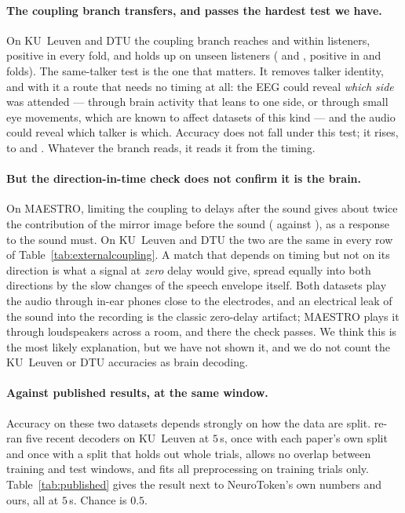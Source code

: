 \paragraph{The coupling branch transfers, and passes the hardest test we have.}
On KU~Leuven and DTU the coupling branch reaches
 and 
within listeners, positive in every fold, and holds up on unseen listeners
( and ,
positive in  and
 folds). The same-talker test is the one that
matters. It removes talker identity, and with it a route that needs no timing at
all: the EEG could reveal \emph{which side} was attended --- through brain
activity that leans to one side, or through small eye movements, which are known
to affect datasets of this kind \citep{rotaru2024} --- and the audio could reveal
which talker is which. Accuracy does not fall under this test; it rises, to
 and .
Whatever the branch reads, it reads it from the timing.

\paragraph{But the direction-in-time check does not confirm it is the brain.}
On MAESTRO, limiting the coupling to delays after the sound gives about twice the
contribution of the mirror image before the sound
( against ), as a
response to the sound must. On KU~Leuven and DTU the two are the same in every row
of Table~\ref{tab:externalcoupling}. A match that depends on timing but not on its
direction is what a signal at \emph{zero} delay would give, spread equally into
both directions by the slow changes of the speech envelope itself. Both datasets
play the audio through in-ear phones close to the electrodes, and an electrical
leak of the sound into the recording is the classic zero-delay artifact; MAESTRO
plays it through loudspeakers across a room, and there the check passes. We think
this is the most likely explanation, but we have not shown it, and we do not count
the KU~Leuven or DTU accuracies as brain decoding.

\paragraph{Against published results, at the same window.}
Accuracy on these two datasets depends strongly on how the data are split.
\citet{alavi2026neurotoken} re-ran five recent decoders on KU~Leuven at $5$\,s,
once with each paper's own split and once with a split that holds out whole
trials, allows no overlap between training and test windows, and fits all
preprocessing on training trials only. Table~\ref{tab:published} gives the result
next to NeuroToken's own numbers and ours, all at $5$\,s. Chance is $0.5$.

